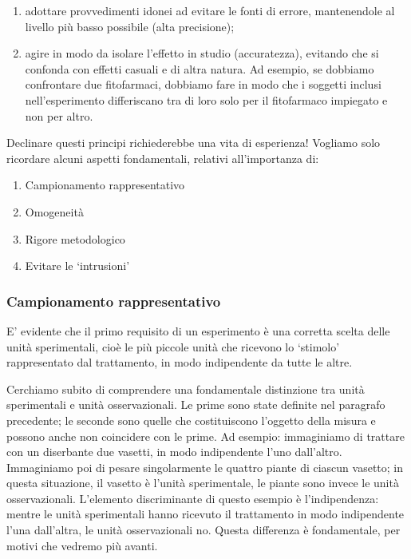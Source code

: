 \documentclass[a4paper,12pt,oneside]{book}
\providecommand{\tightlist}{%
  \setlength{\itemsep}{0pt}\setlength{\parskip}{0pt}}
\theoremstyle{definition}
\theoremstyle{definition}
\theoremstyle{definition}
\theoremstyle{remark}
\begin{document}
\begin{enumerate}
\def\labelenumi{\arabic{enumi}.}
\tightlist
\item
  adottare provvedimenti idonei ad evitare le fonti di errore,
  mantenendole al livello più basso possibile (alta precisione);
\item
  agire in modo da isolare l'effetto in studio (accuratezza), evitando
  che si confonda con effetti casuali e di altra natura. Ad esempio, se
  dobbiamo confrontare due fitofarmaci, dobbiamo fare in modo che i
  soggetti inclusi nell'esperimento differiscano tra di loro solo per il
  fitofarmaco impiegato e non per altro.
\end{enumerate}

Declinare questi principi richiederebbe una vita di esperienza! Vogliamo
solo ricordare alcuni aspetti fondamentali, relativi all'importanza di:

\begin{enumerate}
\def\labelenumi{\arabic{enumi}.}
\tightlist
\item
  Campionamento rappresentativo
\item
  Omogeneità
\item
  Rigore metodologico
\item
  Evitare le `intrusioni'
\end{enumerate}

\subsubsection{Campionamento
rappresentativo}\label{campionamento-rappresentativo}

E' evidente che il primo requisito di un esperimento è una corretta
scelta delle unità sperimentali, cioè le più piccole unità che ricevono
lo `stimolo' rappresentato dal trattamento, in modo indipendente da
tutte le altre.

Cerchiamo subito di comprendere una fondamentale distinzione tra unità
sperimentali e unità osservazionali. Le prime sono state definite nel
paragrafo precedente; le seconde sono quelle che costituiscono l'oggetto
della misura e possono anche non coincidere con le prime. Ad esempio:
immaginiamo di trattare con un diserbante due vasetti, in modo
indipendente l'uno dall'altro. Immaginiamo poi di pesare singolarmente
le quattro piante di ciascun vasetto; in questa situazione, il vasetto è
l'unità sperimentale, le piante sono invece le unità osservazionali.
L'elemento discriminante di questo esempio è l'indipendenza: mentre le
unità sperimentali hanno ricevuto il trattamento in modo indipendente
l'una dall'altra, le unità osservazionali no. Questa differenza è
fondamentale, per motivi che vedremo più avanti.
\end{document}
